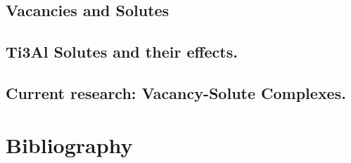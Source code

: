 \documentclass[11pt]{article}
\begin{document}
\subsection{Vacancies and Solutes}
\label{sec:org10eb499}

\subsection{Ti3Al Solutes and their effects.}
\label{sec:org8c3609a}

\subsection{Current research: Vacancy-Solute Complexes.}
\label{sec:org4ead74f}


\section{Bibliography}
\label{sec:org6f8ce3a}
\label{org4f39abb}



\end{document}
